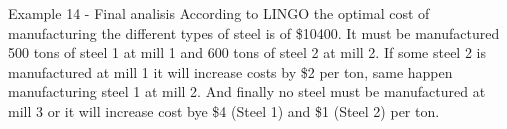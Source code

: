 \begin{frame}{Example 14 - Final analisis}
According to LINGO the optimal cost of manufacturing the different types of
steel is of \$10400. It must be manufactured 500 tons of steel 1 at mill 1 and 600
tons of steel 2 at mill 2. If some steel 2 is manufactured at mill 1 it will increase costs
by \$2 per ton, same happen manufacturing steel 1 at mill 2. And finally no steel must
be manufactured at mill 3 or it will increase cost bye \$4 (Steel 1) and \$1 (Steel 2) per
ton.
\end{frame}
